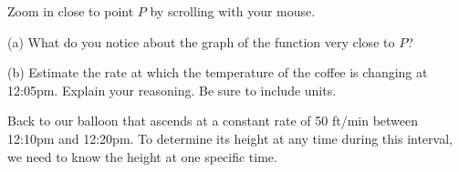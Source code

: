 \documentclass{ximera}
\begin{document}
\begin{exploration}\label{Exp1:LF}
Zoom in close to point $P$ by scrolling with your mouse. 
\begin{question} \label{Q2:LF}
\begin{freeResponse}
(a) What do you notice about the graph of the function very close to $P$?
\end{freeResponse}
(b) Estimate the rate at which the temperature of the coffee is changing at 12:05pm. Explain your reasoning. Be sure to include units.
\end{question}

 
\begin{onlineOnly}
    \begin{center}
\end{center}
\end{onlineOnly}
\end{exploration}


Back to our balloon that ascends at a constant rate of 50 ft/min between 12:10pm and 12:20pm. To determine its height at any time during this interval, we need to know the height at one specific time. 
\end{document}
